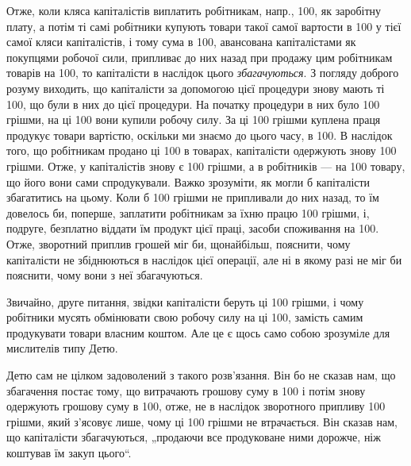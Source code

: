 Отже, коли кляса капіталістів виплатить робітникам, напр., 100,
як заробітну плату, а потім ті самі робітники купують товари такої самої
вартости в 100 у тієї самої кляси капіталістів, і тому сума
в 100, авансована капіталістами як покупцями робочої сили,
припливає до них назад при продажу цим робітникам товарів на 100, то капіталісти в наслідок цього \emph{збагачуються}. З погляду
доброго розуму виходить, що капіталісти за допомогою цієї процедури
знову мають ті 100, що були в них до цієї процедури. На
початку процедури в них було 100 грішми, на ці 100
вони купили робочу силу. За ці 100 грішми куплена праця
продукує товари вартістю, оскільки ми знаємо до цього часу, в 100. В наслідок того, що робітникам продано ці 100 в товарах,
капіталісти одержують знову 100 грішми. Отже, у капіталістів
знову є 100 грішми, а в робітників — на 100
товару, що його вони сами спродукували. Важко зрозуміти, як могли б
капіталісти збагатитись на цьому. Коли б 100 грішми не припливали
до них назад, то їм довелось би, поперше, заплатити робітникам
за їхню працю 100 грішми, і, подруге, безплатно віддати
їм продукт цієї праці, засоби споживання на 100. Отже, зворотний
приплив грошей міг би, щонайбільш, пояснити, чому капіталісти
не збіднюються в наслідок цієї операції, але ні в якому разі не міг би
пояснити, чому вони з неї збагачуються.

Звичайно, друге питання, звідки капіталісти беруть ці 100
грішми, і чому робітники мусять обмінювати свою робочу силу на ці 100, замість самим продукувати товари власним коштом. Але це є щось
само собою зрозуміле для мислителів типу Детю.

Детю сам не цілком задоволений з такого розв’язання. Він бо не
сказав нам, що збагачення постає тому, що витрачають грошову суму
в 100 і потім знову одержують грошову суму в 100,
отже, не в наслідок зворотного припливу 100 грішми, який
з’ясовує лише, чому ці 100 грішми не втрачається. Він сказав
нам, що капіталісти збагачуються, „продаючи все продуковане ними
дорожче, ніж коштував їм закуп цього“.

